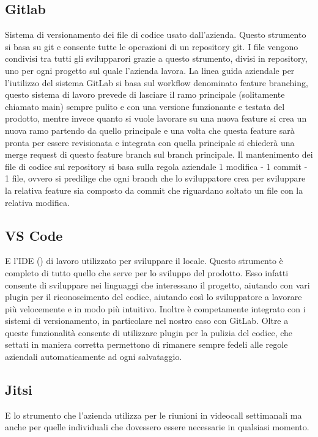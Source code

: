 \subsection*{Gitlab}
Sistema di versionamento dei file di codice usato dall'azienda. Questo strumento si basa su git e consente tutte le operazioni di un repository git.
I file vengono condivisi tra tutti gli svilupparori grazie a questo strumento, divisi in repository, uno per ogni progetto sul quale l'azienda lavora.
La linea guida aziendale per l'iutilizzo del sistema GitLab si basa sul workflow denominato feature branching, questo sistema di lavoro
prevede di lasciare il ramo principale (solitamente chiamato main) sempre pulito e con una versione funzionante e testata del prodotto, mentre invece
quanto si vuole lavorare su una nuova feature si crea un nuova ramo partendo da quello principale e una volta che questa feature sarà pronta per essere
revisionata e integrata con quella principale si chiederà una merge request di questo feature branch sul branch principale.
Il mantenimento dei file di codice sul repository si basa sulla regola aziendale 1 modifica - 1 commit - 1 file, ovvero si predilige che ogni branch che lo sviluppatore crea per sviluppare la relativa feature
sia composto da commit che riguardano soltato un file con la relativa modifica.

\subsection*{VS Code}
E l'IDE () di lavoro utilizzato per sviluppare il locale. Questo strumento è completo di tutto quello che serve per lo sviluppo del prodotto.
Esso infatti consente di sviluppare nei linguaggi che interessano il progetto, aiutando con vari plugin per il riconoscimento del codice,
aiutando così lo sviluppatore a lavorare più velocemente e in modo più intuitivo. Inoltre è competamente integrato con i sistemi di
versionamento, in particolare nel nostro caso con GitLab. Oltre a queste funzionalità consente di utilizzare plugin per la pulizia del
codice, che settati in maniera corretta permettono di rimanere sempre fedeli alle regole aziendali automaticamente ad ogni salvataggio.

\subsection*{Jitsi}
E lo strumento che l'azienda utilizza per le riunioni in videocall settimanali ma anche per quelle individuali che dovessero essere necessarie
in qualsiasi momento.

